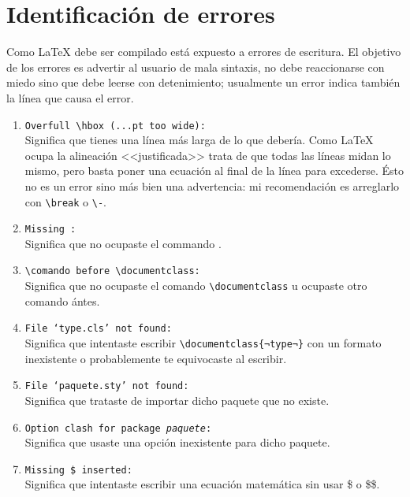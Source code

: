 \chapter{Identificación de errores}
Como \LaTeX{} debe ser compilado está expuesto a errores de escritura.
El objetivo de los errores es advertir al usuario de mala sintaxis, no debe reaccionarse con miedo sino que debe leerse con detenimiento;
usualmente un error indica también la línea que causa el error.

\begin{enumerate}
	\item \verb|Overfull \hbox (...pt too wide):| \\
		Significa que tienes una línea más larga de lo que debería.
		Como \LaTeX{} ocupa la alineación <<justificada>> trata de que todas las líneas midan lo mismo, pero
		basta poner una ecuación al final de la línea para excederse.
		Ésto no es un error sino más bien una advertencia: mi recomendación es arreglarlo con \lstinline|\break|
		o \lstinline|\-|.

	\item \verb|Missing :| \\
		Significa que no ocupaste el commando \verb||.

	\item \verb|\comando before \documentclass:| \\
		Significa que no ocupaste el comando \verb|\documentclass| u ocupaste otro comando ántes.

	\item \texttt{File `\textit{type}.cls' not found:} \\
		Significa que intentaste escribir \lstinline|\documentclass{¬type¬}| con un formato inexistente o probablemente te equivocaste al escribir.

	\item \texttt{File `\textit{paquete}.sty' not found:} \\
		Significa que trataste de importar dicho paquete que no existe.

	\item \texttt{Option clash for package \textit{paquete}:} \\
		Significa que usaste una opción inexistente para dicho paquete.

	\item \texttt{Missing \$ inserted:} \\
		Significa que intentaste escribir una ecuación matemática sin usar \$ o \$\$.


\end{enumerate}
